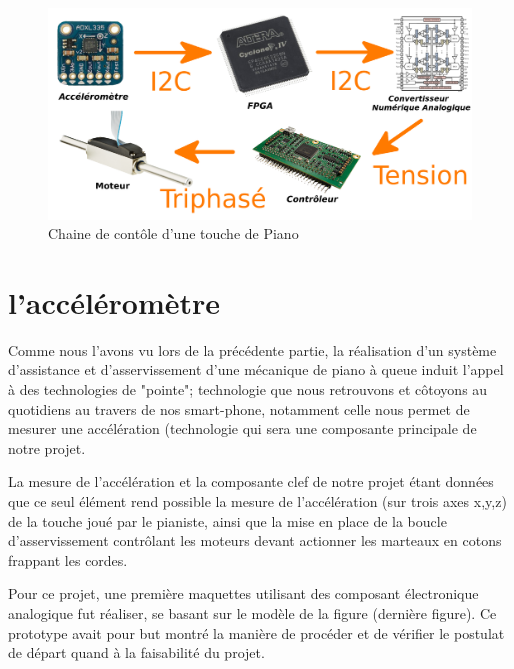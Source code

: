 \documentclass[french,a4paper,12pt]{report}
\begin{document}
		\begin{figure}[!ht]
    \center
  	\includegraphics[width=17cm]{CH.png}
    \caption{Chaine de contôle d'une touche de Piano}
	\end{figure}
	
			\section{l'accéléromètre}
						
			Comme nous l'avons vu lors de la précédente partie, la réalisation d'un système d'assistance et d'asservissement d'une mécanique de piano à queue induit l'appel à des technologies de "pointe"; technologie que nous retrouvons et côtoyons au quotidiens au travers de nos smart-phone, notamment celle nous permet de mesurer une accélération (technologie qui sera une composante principale de notre projet.
 
La mesure de l'accélération et la composante clef de notre projet étant données que ce seul élément rend possible la mesure de l'accélération (sur trois axes x,y,z) de la touche joué par le pianiste, ainsi que la mise en place de la boucle d'asservissement contrôlant les moteurs devant actionner les marteaux en cotons frappant les cordes.

			
			Pour ce projet, une première maquettes utilisant des composant électronique analogique fut réaliser, se basant sur le modèle de la figure (dernière figure). Ce prototype avait pour but montré la manière de procéder et de vérifier le postulat de départ quand à la faisabilité du projet.
 
\end{document}
